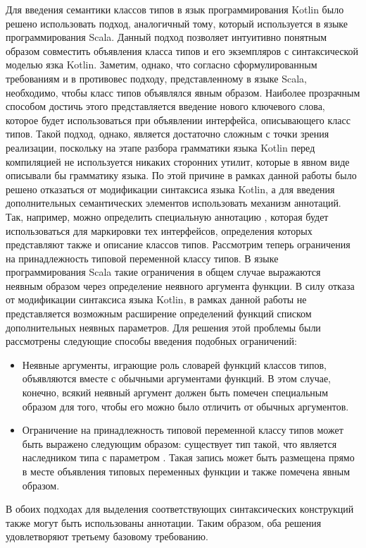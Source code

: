 Для введения семантики классов типов в язык программирования Kotlin было решено использовать подход, аналогичный тому, который используется в языке программирования Scala. Данный подход позволяет интуитивно понятным образом совместить объявления класса типов и его экземпляров с синтаксической моделью язка Kotlin. Заметим, однако, что согласно сформулированным требованиям и в противовес подходу, представленному в языке Scala, необходимо, чтобы класс типов объявлялся явным образом. Наиболее прозрачным способом достичь этого представляется введение нового ключевого слова, которое будет использоваться при объявлении интерфейса, описывающего класс типов. Такой подход, однако, является достаточно сложным с точки зрения реализации, поскольку на этапе разбора грамматики языка Kotlin перед компиляцией не используется никаких сторонних утилит, которые в явном виде описывали бы грамматику языка. По этой причине в рамках данной работы было решено отказаться от модификации синтаксиса языка Kotlin, а для введения дополнительных семантических элементов использовать механизм аннотаций. Так, например, можно определить специальную аннотацию , которая будет использоваться для маркировки тех интерфейсов, определения которых представляют также и описание классов типов. Рассмотрим теперь ограничения на принадлежность типовой переменной классу типов. В языке программирования Scala такие ограничения в общем случае выражаются неявным образом через определение неявного аргумента функции. В силу отказа от модификации синтаксиса языка Kotlin, в рамках данной работы не представляется возможным расширение определений функций списком дополнительных неявных параметров. Для решения этой проблемы были рассмотрены следующие способы введения подобных ограничений:
\begin{itemize}
    \item Неявные аргументы, играющие роль словарей функций классов типов, объявляются вместе с обычными аргументами функций. В этом случае, конечно, всякий неявный аргумент должен быть помечен специальным образом для того, чтобы его можно было отличить от обычных аргументов. 
    \item Ограничение на принадлежность типовой переменной  классу типов  может быть выражено следующим образом: существует тип  такой, что  является наследником типа  с параметром . Такая запись может быть размещена прямо в месте объявления типовых переменных функции и также помечена явным образом.
\end{itemize}
В обоих подходах для выделения соответствующих синтаксических конструкций также могут быть использованы аннотации. Таким образом, оба решения удовлетворяют третьему базовому требованию.  

